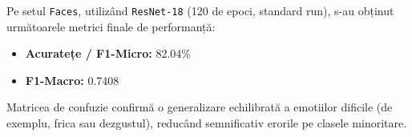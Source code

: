 \documentclass[12pt,a4paper]{article}
\begin{document}
Pe setul \texttt{Faces}, utilizând \texttt{ResNet-18} (120 de epoci, standard run), s-au obținut următoarele metrici finale de performanță:
\begin{itemize}
    \item \textbf{Acuratețe / F1-Micro:} 82.04\%
    \item \textbf{F1-Macro:} 0.7408
\end{itemize}
Matricea de confuzie confirmă o generalizare echilibrată a emotiilor dificile (de exemplu, frica sau dezgustul), reducând semnificativ erorile pe clasele minoritare.
\end{document}
